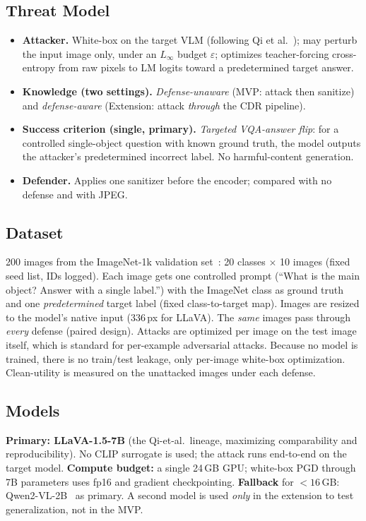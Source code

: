\documentclass[11pt]{article}
\begin{document}
\subsection{Threat Model}
\begin{itemize}
\item \textbf{Attacker.} White-box on the target VLM (following
      Qi et al.~\cite{qi2024visualaaai}); may perturb the input image only, under
      an $L_\infty$ budget $\varepsilon$; optimizes teacher-forcing cross-entropy
      from raw pixels to LM logits toward a predetermined target answer.
\item \textbf{Knowledge (two settings).} \emph{Defense-unaware} (MVP: attack
      then sanitize) and \emph{defense-aware} (Extension: attack \emph{through}
      the CDR pipeline).
\item \textbf{Success criterion (single, primary).} \emph{Targeted VQA-answer
      flip}: for a controlled single-object question with known ground truth, the
      model outputs the attacker's predetermined incorrect label. No
      harmful-content generation.
\item \textbf{Defender.} Applies one sanitizer before the encoder; compared with
      no defense and with JPEG.
\end{itemize}

\subsection{Dataset}
200 images from the ImageNet-1k validation
set~\cite{deng2009imagenet}: 20 classes $\times$ 10 images (fixed seed list,
IDs logged). Each image gets one controlled prompt (``What is the main object?
Answer with a single label.'') with the ImageNet class as ground truth and one
\emph{predetermined} target label (fixed class-to-target map). Images are resized
to the model's native input (336\,px for LLaVA). The \emph{same} images pass
through \emph{every} defense (paired design). Attacks are optimized per image on
the test image itself, which is standard for per-example adversarial attacks.
Because no model is trained, there is no train/test leakage, only per-image
white-box optimization. Clean-utility is measured on the unattacked images under
each defense.

\subsection{Models}
\textbf{Primary: LLaVA-1.5-7B} (the Qi-et-al.~lineage, maximizing comparability
and reproducibility). No CLIP surrogate is used; the attack runs end-to-end on the
target model. \textbf{Compute budget:} a single 24\,GB GPU; white-box PGD through
7B parameters uses fp16 and gradient checkpointing. \textbf{Fallback} for
$<16$\,GB: Qwen2-VL-2B~\cite{wang2024qwen2vl} as primary. A second model is used
\emph{only} in the extension to test generalization, not in the MVP.
\end{document}
